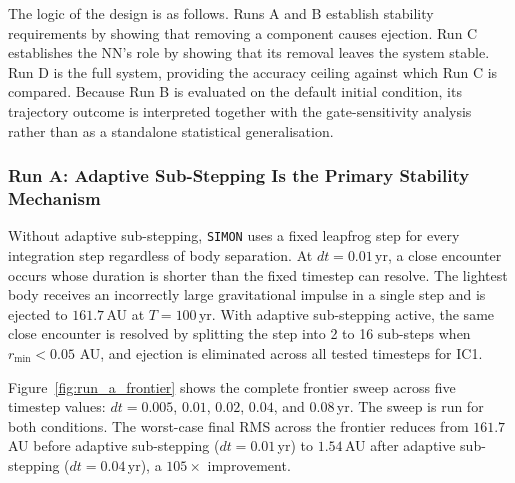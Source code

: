\documentclass[12pt]{article}
\begin{document}
\begin{table}[H]
\centering
\caption{Four-run ablation framework for IC1 over $T=100$\,yr. Each run removes or replaces one component of the full \texttt{SIMON} configuration.}
\label{tab:ablation}
\end{table}

\noindent The logic of the design is as follows. Runs A and B establish stability requirements by
showing that removing a component causes ejection. Run C establishes the NN’s role by
showing that its removal leaves the system stable. Run D is the full system, providing
the accuracy ceiling against which Run C is compared. Because Run B is evaluated on the
default initial condition, its trajectory outcome is interpreted together with the
gate-sensitivity analysis rather than as a standalone statistical generalisation.

\subsubsection{Run A: Adaptive Sub-Stepping Is the Primary Stability Mechanism}
\label{sec:run_a}

Without adaptive sub-stepping, \texttt{SIMON} uses a fixed leapfrog step for every
integration step regardless of body separation. At $dt = 0.01$\,yr, a close encounter
occurs whose duration is shorter than the fixed timestep can resolve. The lightest
body receives an incorrectly large gravitational impulse in a single step and is ejected
to $161.7$\,AU at $T = 100$\,yr. With adaptive sub-stepping active, the same close encounter is resolved by splitting the step
into 2 to 16 sub-steps when $r_{\min} < 0.05$ AU, and ejection is eliminated across all tested
timesteps for IC1.

Figure~\ref{fig:run_a_frontier} shows the complete frontier
sweep across five timestep values: $dt = 0.005$, $0.01$, $0.02$,
$0.04$, and $0.08$\,yr. The sweep is run for both conditions. The
worst-case final RMS across the frontier reduces from $161.7$\,AU
before adaptive sub-stepping ($dt = 0.01$\,yr) to $1.54$\,AU after
adaptive sub-stepping ($dt = 0.04$\,yr), a $105\times$ improvement.
\end{document}
